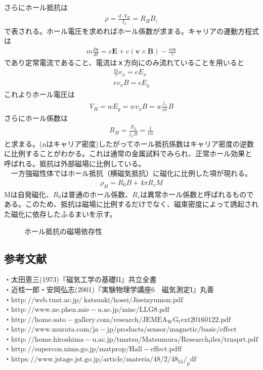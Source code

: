 \documentclass{jsarticle}
\begin{document}
さらにホール抵抗は
\begin{align}
\rho=\frac{d\cdot V_H}{I_x}=R_HB_z
\end{align}
で表される。ホール電圧を求めればホール係数が求まる。キャリアの運動方程式は
\begin{align}
m\frac{d\bm{v}}{dt}=e\bm{E}+e(\bm{v}\times\bm{B})-\frac{m\bm{v}}{\tau}
\end{align}
であり定常電流であること、電流はｘ方向にのみ流れていることを用いると
\begin{align}
\frac{m}{\tau}v_x=eE_x\\
ev_xB=eE_y
\end{align}
これよりホール電圧は
\begin{align}
V_H=wE_y=wv_xB=w\frac{j_x}{ne}B
\end{align}
さらにホール係数は
\begin{align}
R_H=\frac{E_y}{j_xB}=\frac{1}{en}
\end{align}
と求まる。(nはキャリア密度)したがってホール抵抗係数はキャリア密度の逆数に比例することがわかる。これは通常の金属試料でみられ、正常ホール効果と呼ばれる。抵抗は外部磁場に比例している。\\
\quad　一方強磁性体ではホール抵抗（横磁気抵抗）に磁化に比例した項が現れる。
\begin{align}
\rho_H=R_0B+4\pi R_sM
\end{align}
Mは自発磁化、$R_0$は普通のホール係数、$R_s$は異常ホール係数と呼ばれるものである。このため、抵抗は磁場に比例するだけでなく、磁束密度によって誘起された磁化に依存したふるまいを示す。
\begin{figure}[htbp]
\begin{center}
 \end{center}
 \caption{ホール抵抗の磁場依存性}
 \label{fig:one}
\end{figure}
\subsection*{参考文献}
・太田恵三(1973)『磁気工学の基礎II』共立全書\\
\quad  ・近桂一郎・安岡弘志(2001)『実験物理学講座6　磁気測定I』丸善\\
\quad・$\mathrm{http://web.tuat.ac.jp/~katsuaki/hosei/Jiseinyumon.pdf}$\\
\quad・$\mathrm{http://www.ne.phen.mie-u.ac.jp/misc/LLG8.pdf}$\\
\quad・$\mathrm{http://home.sato-gallery.com/research/JEMEA_WG_text20160122.pdf}$\\
\quad・$\mathrm{http://www.murata.com/ja-jp/products/sensor/magnetic/basic/effect}$\\
\quad・$\mathrm{http://home.hiroshima-u.ac.jp/tmatsu/Matsumura/Research_files/trnsprt.pdf}$\\
\quad・$\mathrm{http://supercon.nims.go.jp/matprop/Hall-effect.pdff}$\\
\quad・$\mathrm{https://www.jstage.jst.go.jp/article/materia/48/2/48_55/_pdf}$\\
\end{document}
